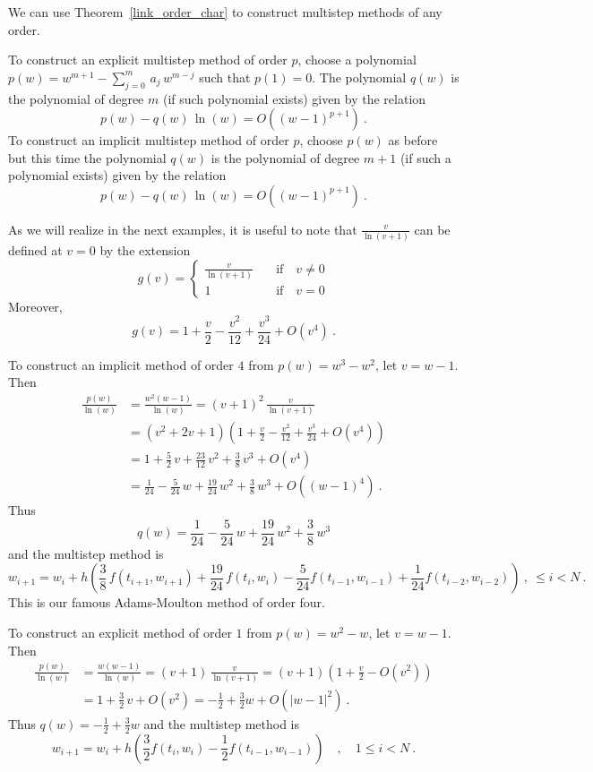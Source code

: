 We can use Theorem~\ref{link_order_char} to construct multistep
methods of any order.

To construct an explicit multistep method of order $p$, choose a
polynomial $\displaystyle p(w)= w^{m+1} - \sum_{j=0}^m\,a_j\,w^{m-j}$
such that $p(1)=0$.  The polynomial $q(w)$ is the polynomial of degree
$m$ (if such polynomial exists) given by the relation 
\[
p(w) - q(w)\,\ln(w) = O((w-1)^{p+1}) \ .
\]
To construct an implicit multistep method of order $p$, choose $p(w)$
as before but this time the polynomial $q(w)$ is the polynomial
of degree $m+1$ (if such a polynomial exists) given by the relation 
\[
p(w) - q(w)\,\ln(w) = O((w-1)^{p+1}) \ .
\]

As we will realize in the next examples, it is useful to note that
$\displaystyle \frac{v}{\ln(v+1)}$ can be defined at $v=0$ by the
extension
\[
g(v) = \begin{cases}
\displaystyle \frac{v}{\ln(v+1)} & \quad \text{if} \quad v \neq 0 \\
1 & \quad \text{if} \quad v = 0  
\end{cases}
\]
Moreover, 
\[
g(v) = 1 + \frac{v}{2} - \frac{v^2}{12} + \frac{v^3}{24} + O(v^4) \ .
\]

\begin{egg}
To construct an implicit method of order $4$ from $p(w) = w^3- w^2$,
let $v=w-1$.  Then
\begin{align*}
\frac{p(w)}{\ln(w)}
&= \frac{w^2(w-1)}{\ln(w)} = (v+1)^2\, \frac{v}{\ln(v+1)} \\
&= (v^2+2v+1)\left(1 + \frac{v}{2} - \frac{v^2}{12} + \frac{v^3}{24}
+ O(v^4) \right) \\
&= 1 + \frac{5}{2}\,v + \frac{23}{12}\,v^2 + \frac{3}{8} \, v^3
+ O(v^4) \\
&= \frac{1}{24} - \frac{5}{24}\,w + \frac{19}{24}\,w^2
+ \frac{3}{8} \, w^3 + O((w-1)^4) \ .
\end{align*}
Thus
\[
  q(w) = \frac{1}{24} - \frac{5}{24}\,w + \frac{19}{24}\,w^2
  + \frac{3}{8} \, w^3
\]
and the multistep method is
\[
w_{i+1} = w_i + h \left(
\frac{3}{8}\,f(t_{i+1},w_{i+1}) + \frac{19}{24}\,f(t_i,w_i)
-\frac{5}{24} f(t_{i-1},w_{i-1}) + \frac{1}{24}f(t_{i-2},w_{i-2}) \right)
\ , \ \leq i < N \ .
\]
This is our famous Adams-Moulton method of order four.
\end{egg}

\begin{egg}
To construct an explicit method of order $1$ from $p(w) = w^2-w$, let
$v=w-1$.  Then
\begin{align*}
\frac{p(w)}{\ln(w)} &= \frac{w(w-1)}{\ln(w)}
= (v+1)\, \frac{v}{\ln(v+1)}
= (v+1)\left(1 + \frac{v}{2} - O(v^2) \right) \\
&= 1 + \frac{3}{2}\,v + O(v^2)
= -\frac{1}{2} + \frac{3}{2} w + O(|w-1|^2) \ .
\end{align*}
Thus $\displaystyle q(w) = -\frac{1}{2} + \frac{3}{2} w$ and
the multistep method is
\[
w_{i+1} = w_i + h \left( \frac{3}{2} f(t_i,w_i)
-\frac{1}{2} f(t_{i-1},w_{i-1}) \right) \quad, \quad 1 \leq i < N \ .
\]
\end{egg}

